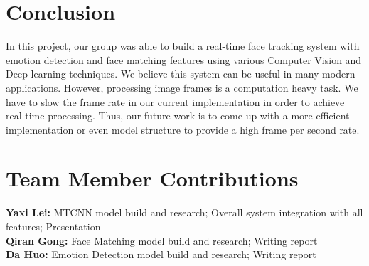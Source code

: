\documentclass[10pt,twocolumn,letterpaper]{article}
\begin{document}
\section{Conclusion}
In this project, our group was able to build a real-time face tracking system with emotion detection and face matching features using various Computer Vision and Deep learning techniques. We believe this system can be useful in many modern applications. However, processing image frames is a computation heavy task. We have to slow the frame rate in our current implementation in order to achieve real-time processing. Thus, our future work is to come up with a more efficient implementation or even model structure to provide a high frame per second rate.  






\newpage
\appendixpage
\section{Team Member Contributions}
\textbf{Yaxi Lei:} MTCNN model build and research; Overall system integration with all features; Presentation
\\

\textbf{Qiran Gong:} Face Matching model build and research; Writing report
\\

\textbf{Da Huo:} Emotion Detection model build and research; Writing report
\end{document}
